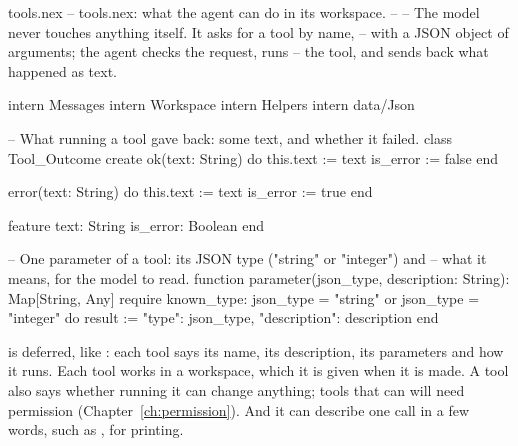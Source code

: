 \begin{newfile}{tools.nex}
-- tools.nex: what the agent can do in its workspace.
--
-- The model never touches anything itself. It asks for a tool by name,
-- with a JSON object of arguments; the agent checks the request, runs
-- the tool, and sends back what happened as text.

intern Messages
intern Workspace
intern Helpers
intern data/Json

-- What running a tool gave back: some text, and whether it failed.
class Tool_Outcome
create
  ok(text: String) do
    this.text := text
    is_error := false
  end

  error(text: String) do
    this.text := text
    is_error := true
  end

feature
  text: String
  is_error: Boolean
end

-- One parameter of a tool: its JSON type ("string" or "integer") and
-- what it means, for the model to read.
function parameter(json_type, description: String): Map[String, Any]
require
  known_type: json_type = "string" or json_type = "integer"
do
  result := {"type": json_type, "description": description}
end
\end{newfile}

 is deferred, like : each tool says its name, its
description, its parameters and how it runs. Each tool works in a
workspace, which it is given when it is made. A tool also says whether
running it can change anything; tools that can will need permission
(Chapter~\ref{ch:permission}). And it can describe one call in a few
words, such as , for printing.

